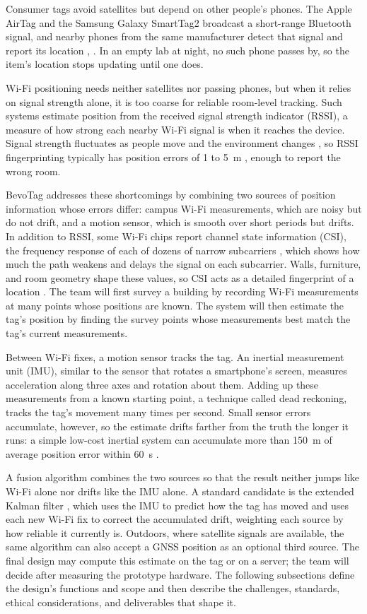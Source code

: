 \documentclass[12pt,letterpaper]{article}
\begin{document}
Consumer tags avoid satellites but depend on other people's phones. The Apple AirTag and the Samsung
Galaxy SmartTag2 broadcast a short-range Bluetooth signal, and nearby phones from the same
manufacturer detect that signal and report its location \cite{airtag}, \cite{smarttag}. In an empty
lab at night, no such phone passes by, so the item's location stops updating until one does.

Wi-Fi positioning needs neither satellites nor passing phones, but when it relies on signal strength
alone, it is too coarse for reliable room-level tracking. Such systems estimate position from the
received signal strength indicator (RSSI), a measure of how strong each nearby Wi-Fi signal is when
it reaches the device. Signal strength fluctuates as people move and the environment changes
\cite{hechan}, so RSSI fingerprinting typically has position errors of 1 to 5~m \cite{rssi}, enough
to report the wrong room.

BevoTag addresses these shortcomings by combining two sources of position information whose errors
differ: campus Wi-Fi measurements, which are noisy but do not drift, and a motion sensor, which is
smooth over short periods but drifts. In addition to RSSI, some Wi-Fi chips report channel state
information (CSI), the frequency response of each of dozens of narrow subcarriers \cite{espcsi},
which shows how much the path weakens and delays the signal on each subcarrier. Walls, furniture,
and room geometry shape these values, so CSI acts as a detailed fingerprint of a location
\cite{yangcsi}. The team will first survey a building by recording Wi-Fi measurements at many
points whose positions are known. The system will then estimate the tag's position by finding the
survey points whose measurements best match the tag's current measurements.

Between Wi-Fi fixes, a motion sensor tracks the tag. An inertial measurement unit (IMU), similar to
the sensor that rotates a smartphone's screen, measures acceleration along three axes and rotation
about them. Adding up these measurements from a known starting point, a technique called dead
reckoning, tracks the tag's movement many times per second. Small sensor errors accumulate,
however, so the estimate drifts farther from the truth the longer it runs: a simple low-cost
inertial system can accumulate more than 150~m of average position error within 60~s \cite{imu}.

A fusion algorithm combines the two sources so that the result neither jumps like Wi-Fi alone nor
drifts like the IMU alone. A standard candidate is the extended Kalman filter \cite{welch}, which
uses the IMU to predict how the tag has moved and uses each new Wi-Fi fix to correct the
accumulated drift, weighting each source by how reliable it currently is. Outdoors, where
satellite signals are available, the same algorithm can also accept a GNSS position as an optional
third source. The final design may compute this estimate on the tag or on a server; the team will
decide after measuring the prototype hardware. The following subsections define the design's
functions and scope and then describe the challenges, standards, ethical considerations, and
deliverables that shape it.
\end{document}

